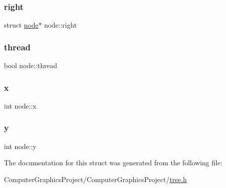 \mbox{\label{structnode_a875f75abfe22103500535b179828e4e3}} 
\subsubsection{\texorpdfstring{right}{right}}
{\footnotesize\ttfamily struct \hyperlink{structnode}{node}$\ast$ node\+::right}

\mbox{\label{structnode_afd9ff5fa3c3ab99d07cac2a7ad9d14a6}} 
\subsubsection{\texorpdfstring{thread}{thread}}
{\footnotesize\ttfamily bool node\+::thread}

\mbox{\label{structnode_a64dd8b65a7d38c632a017d7f36444dbb}} 
\subsubsection{\texorpdfstring{x}{x}}
{\footnotesize\ttfamily int node\+::x}

\mbox{\label{structnode_ae944a3a75efb9856fa5c6f2221e2b49e}} 
\subsubsection{\texorpdfstring{y}{y}}
{\footnotesize\ttfamily int node\+::y}



The documentation for this struct was generated from the following file\+:\begin{DoxyCompactItemize}
\item 
Computer\+Graphics\+Project/\+Computer\+Graphics\+Project/\hyperlink{tree_8h}{tree.\+h}\end{DoxyCompactItemize}
